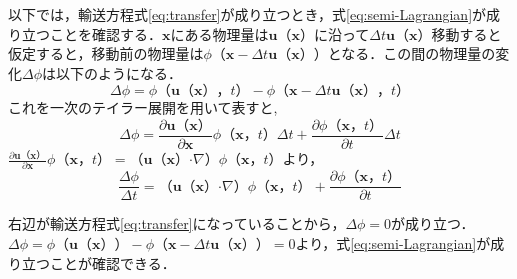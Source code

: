 \documentclass[a4j,12pt]{jreport}
\begin{document}
以下では，輸送方程式\ref{eq:transfer}が成り立つとき，式\ref{eq:semi-Lagrangian}が成り立つことを確認する．$\bm{x}$にある物理量は$\bm{u} （\bm{x}） $に沿って$\varDelta t\bm{u} （\bm{x}）$移動すると仮定すると，移動前の物理量は$\phi（\bm{x} -  \varDelta t\bm{u} （\bm{x}））$となる．この間の物理量の変化$\varDelta {\phi}$は以下のようになる．
\[
\varDelta \phi = \phi（ \bm{u} （\bm{x}），t） - \phi （\bm{x} - \varDelta t\bm{u} （\bm{x}），t）
\]
これを一次のテイラー展開を用いて表すと,
\[
\varDelta \phi   = \frac{\partial \bm{u} （\bm{x}） }{\partial \bm{x}}\phi （\bm{x}，t） \varDelta t + \frac{\partial \phi （\bm{x}，t） }{\partial t}\varDelta t
\]
$\frac{\partial \bm{u} （\bm{x}） }{\partial \bm{x}}\phi （\bm{x}，t）= （\bm{u}（\bm{x}） \boldsymbol{\cdot}\nabla）\phi（\bm{x}，t）$より，
\[
 \frac{\varDelta \phi}{\varDelta t} =  （\bm{u}（\bm{x}）\boldsymbol{\cdot}\nabla） \phi（\bm{x}，t） + \frac{\partial \phi（\bm{x}，t） }{\partial t}
 \]
 
 右辺が輸送方程式\ref{eq:transfer}になっていることから，$ \varDelta \phi =0$が成り立つ．
$\varDelta \phi = \phi（ \bm{u} （\bm{x}）） - \phi （\bm{x} - \varDelta t\bm{u} （\bm{x}））= 0$より，式\ref{eq:semi-Lagrangian}が成り立つことが確認できる．
\end{document}
